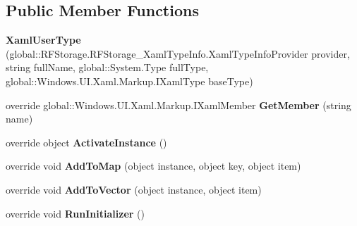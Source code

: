 \subsection*{Public Member Functions}
\begin{DoxyCompactItemize}
\item 
\mbox{\label{class_r_f_storage_1_1_r_f_storage___xaml_type_info_1_1_xaml_user_type_ad7e2164f0d43a2cc89575a33f76500eb}} 
{\bfseries Xaml\+User\+Type} (global\+::\+R\+F\+Storage.\+R\+F\+Storage\+\_\+\+Xaml\+Type\+Info.\+Xaml\+Type\+Info\+Provider provider, string full\+Name, global\+::\+System.\+Type full\+Type, global\+::\+Windows.\+U\+I.\+Xaml.\+Markup.\+I\+Xaml\+Type base\+Type)
\item 
\mbox{\label{class_r_f_storage_1_1_r_f_storage___xaml_type_info_1_1_xaml_user_type_a61367d87091d31711e4e895f09b4a3be}} 
override global\+::\+Windows.\+U\+I.\+Xaml.\+Markup.\+I\+Xaml\+Member {\bfseries Get\+Member} (string name)
\item 
\mbox{\label{class_r_f_storage_1_1_r_f_storage___xaml_type_info_1_1_xaml_user_type_a34b27111c1fe6d60552551ef083b7ca0}} 
override object {\bfseries Activate\+Instance} ()
\item 
\mbox{\label{class_r_f_storage_1_1_r_f_storage___xaml_type_info_1_1_xaml_user_type_ab73ac5a9e59f727397d003f6fecc41b5}} 
override void {\bfseries Add\+To\+Map} (object instance, object key, object item)
\item 
\mbox{\label{class_r_f_storage_1_1_r_f_storage___xaml_type_info_1_1_xaml_user_type_a0944343edec9ca03f9febcb2f2795275}} 
override void {\bfseries Add\+To\+Vector} (object instance, object item)
\item 
\mbox{\label{class_r_f_storage_1_1_r_f_storage___xaml_type_info_1_1_xaml_user_type_aa2fdc38936471ca3f86db788b9e09914}} 
override void {\bfseries Run\+Initializer} ()
\item 

\end{DoxyCompactItemize}
